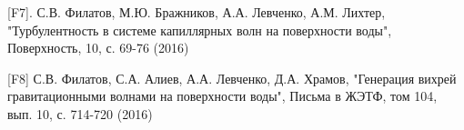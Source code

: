 [F7]. С.В. Филатов, М.Ю. Бражников, А.А. Левченко,  А.М. Лихтер, "Турбулентность в системе капиллярных волн на поверхности воды", Поверхность, 10, с. 69-76 (2016)

[F8] С.В. Филатов, С.А. Алиев, А.А. Левченко, Д.А. Храмов, "Генерация вихрей гравитационными волнами на поверхности воды", Письма в ЖЭТФ, том 104, вып.  10, с. 714-720 (2016)



%
%
%
%
%
%
%
%
%
%
% 
%
%
%
%
%
%
